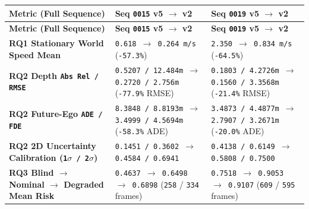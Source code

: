\documentclass[10.5pt,a4paper]{article}
\begin{document}
\begin{footnotesize}
\setlength{\tabcolsep}{4pt}
\setlength{\LTleft}{0pt}\setlength{\LTright}{0pt}
\begin{longtable}{>{\raggedright\arraybackslash}p{} >{\raggedright\arraybackslash}p{} >{\raggedright\arraybackslash}p{}}
\toprule
\textbf{Metric (Full Sequence)} & \textbf{Seq \texttt{0015} v5 $\rightarrow$ v2} & \textbf{Seq \texttt{0019} v5 $\rightarrow$ v2} \\
\midrule
\endfirsthead
\toprule
\textbf{Metric (Full Sequence)} & \textbf{Seq \texttt{0015} v5 $\rightarrow$ v2} & \textbf{Seq \texttt{0019} v5 $\rightarrow$ v2} \\
\midrule
\endhead
\bottomrule
\endfoot
\textbf{RQ1 Stationary World Speed Mean} & \texttt{0.\allowbreak{}618 $\rightarrow$ 0.\allowbreak{}264 m/\allowbreak{}s} (\texttt{-\allowbreak{}57.\allowbreak{}3\%}) & \texttt{2.\allowbreak{}350 $\rightarrow$ 0.\allowbreak{}834 m/\allowbreak{}s} (\texttt{-\allowbreak{}64.\allowbreak{}5\%}) \\
\textbf{RQ2 Depth \texttt{Abs Rel /\allowbreak{} RMSE}} & \texttt{0.\allowbreak{}5207 /\allowbreak{} 12.\allowbreak{}484m $\rightarrow$ 0.\allowbreak{}2720 /\allowbreak{} 2.\allowbreak{}756m} (\texttt{-\allowbreak{}77.\allowbreak{}9\%} RMSE) & \texttt{0.\allowbreak{}1803 /\allowbreak{} 4.\allowbreak{}2726m $\rightarrow$ 0.\allowbreak{}1560 /\allowbreak{} 3.\allowbreak{}3568m} (\texttt{-\allowbreak{}21.\allowbreak{}4\%} RMSE) \\
\textbf{RQ2 Future-Ego \texttt{ADE /\allowbreak{} FDE}} & \texttt{8.\allowbreak{}3848 /\allowbreak{} 8.\allowbreak{}8193m $\rightarrow$ 3.\allowbreak{}4999 /\allowbreak{} 4.\allowbreak{}5694m} (\texttt{-\allowbreak{}58.\allowbreak{}3\%} ADE) & \texttt{3.\allowbreak{}4873 /\allowbreak{} 4.\allowbreak{}4877m $\rightarrow$ 2.\allowbreak{}7907 /\allowbreak{} 3.\allowbreak{}2671m} (\texttt{-\allowbreak{}20.\allowbreak{}0\%} ADE) \\
\textbf{RQ2 2D Uncertainty Calibration (\texttt{1$\sigma$ /\allowbreak{} 2$\sigma$})} & \texttt{0.\allowbreak{}1451 /\allowbreak{} 0.\allowbreak{}3602 $\rightarrow$ 0.\allowbreak{}4584 /\allowbreak{} 0.\allowbreak{}6941} & \texttt{0.\allowbreak{}4138 /\allowbreak{} 0.\allowbreak{}6149 $\rightarrow$ 0.\allowbreak{}5808 /\allowbreak{} 0.\allowbreak{}7500} \\
\textbf{RQ3 Blind $\rightarrow$ Nominal $\rightarrow$ Degraded Mean Risk} & \texttt{0.\allowbreak{}4637 $\rightarrow$ 0.\allowbreak{}6498 $\rightarrow$ 0.\allowbreak{}6898} (\texttt{258} / \texttt{334} frames) & \texttt{0.\allowbreak{}7518 $\rightarrow$ 0.\allowbreak{}9053 $\rightarrow$ 0.\allowbreak{}9107} (\texttt{609} / \texttt{595} frames) \\
\end{longtable}
\end{footnotesize}
\end{document}
